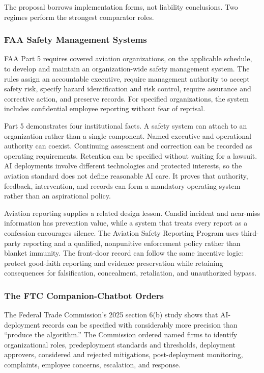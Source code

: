 The proposal borrows implementation forms, not liability conclusions. Two regimes perform the strongest comparator roles.

\subsubsection{FAA Safety Management Systems}

FAA Part 5 requires covered aviation organizations, on the applicable schedule, to develop and maintain an organization-wide safety management system. The rules assign an accountable executive, require management authority to accept safety risk, specify hazard identification and risk control, require assurance and corrective action, and preserve records. For specified organizations, the system includes confidential employee reporting without fear of reprisal.

Part 5 demonstrates four institutional facts. A safety system can attach to an organization rather than a single component. Named executive and operational authority can coexist. Continuing assessment and correction can be recorded as operating requirements. Retention can be specified without waiting for a lawsuit. AI deployments involve different technologies and protected interests, so the aviation standard does not define reasonable AI care. It proves that authority, feedback, intervention, and records can form a mandatory operating system rather than an aspirational policy.

Aviation reporting supplies a related design lesson. Candid incident and near-miss information has prevention value, while a system that treats every report as a confession encourages silence. The Aviation Safety Reporting Program uses third-party reporting and a qualified, nonpunitive enforcement policy rather than blanket immunity. The front-door record can follow the same incentive logic: protect good-faith reporting and evidence preservation while retaining consequences for falsification, concealment, retaliation, and unauthorized bypass.

\subsubsection{The FTC Companion-Chatbot Orders}

The Federal Trade Commission's 2025 section 6(b) study shows that AI-deployment records can be specified with considerably more precision than ``produce the algorithm.'' The Commission ordered named firms to identify organizational roles, predeployment standards and thresholds, deployment approvers, considered and rejected mitigations, post-deployment monitoring, complaints, employee concerns, escalation, and response.

